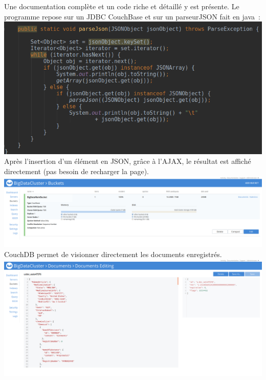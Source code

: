 \documentclass{article}
\begin{document}
Une documentation complète et un code riche et détaillé y est présente.
Le programme repose sur un JDBC CouchBase et sur un parseurJSON fait en java :\\

\includegraphics[scale=0.6]{couchBase/java.png}\\

Après l’insertion d’un élément en JSON, grâce à l’AJAX, le résultat est affiché directement (pas besoin de recharger la page). \\

\includegraphics[scale=0.2]{couchBase/ajoutjava.png}\\

\newpage
CouchDB permet de visionner directement les documents enregistrés.\\

\includegraphics[scale=0.2]{couchBase/docjava.png}\\
\end{document}
